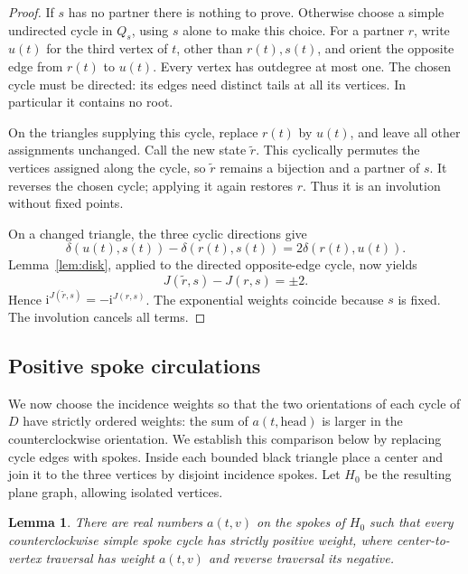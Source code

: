 \documentclass[11pt]{article}
\newtheorem{lemma}[theorem]{Lemma}
\theoremstyle{remark}
\newcommand{\ii}{\mathrm i}
\numberwithin{equation}{section}
\begin{document}
\begin{proof}
If \(s\) has no partner there is nothing to prove.
Otherwise choose a simple undirected cycle in \(Q_s\),
using \(s\) alone to make this choice.
For a partner \(r\), write \(u(t)\) for the third vertex
of \(t\), other than \(r(t),s(t)\), and orient the
opposite edge from \(r(t)\) to \(u(t)\). Every vertex
has outdegree at most one. The chosen cycle must be
directed: its edges need distinct tails at all its
vertices. In particular it contains no root.

On the triangles supplying this cycle, replace \(r(t)\)
by \(u(t)\), and leave all other assignments unchanged.
Call the new state \(\widetilde r\). This cyclically
permutes the vertices assigned along the cycle, so
\(\widetilde r\) remains a bijection and a partner of \(s\).
It reverses the chosen cycle; applying it again restores
\(r\). Thus it is an involution without fixed points.

On a changed triangle, the three cyclic directions give
\[
 \delta(u(t),s(t))-\delta(r(t),s(t))
      =2\delta(r(t),u(t)).
\]
Lemma~\ref{lem:disk}, applied to the directed opposite-edge
cycle, now yields
\[
 J(\widetilde r,s)-J(r,s)=\pm2.
\]
Hence \(\ii^{J(\widetilde r,s)}=-\ii^{J(r,s)}\).
The exponential weights coincide because \(s\) is fixed.
The involution cancels all terms.
\end{proof}

\subsection{Positive spoke circulations}

We now choose the incidence weights so that the two orientations of each
cycle of \(D\) have strictly ordered weights: the sum of
\(a(t,\mathrm{head})\) is larger in the counterclockwise orientation.
We establish this comparison below by replacing cycle edges with spokes.
Inside each bounded black triangle place a center and join
it to the three vertices by disjoint incidence spokes.
Let \(H_0\) be the resulting plane graph, allowing isolated
vertices.

\begin{lemma}\label{lem:circulation}
There are real numbers \(a(t,v)\) on the spokes of \(H_0\)
such that every counterclockwise simple spoke cycle has
strictly positive weight, where center-to-vertex traversal
has weight \(a(t,v)\) and reverse traversal its negative.
\end{lemma}
\end{document}
